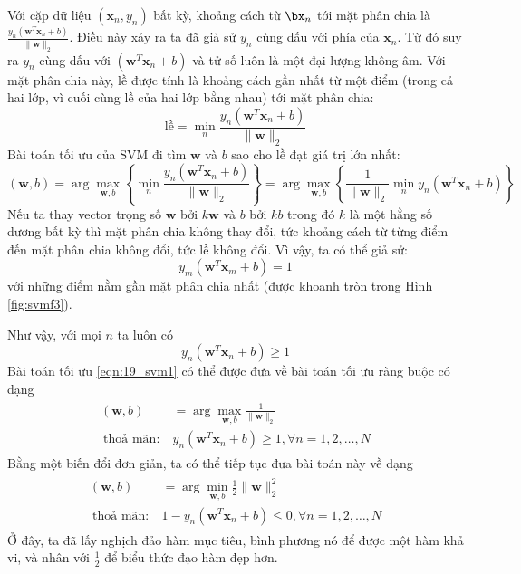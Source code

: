 Với cặp dữ liệu
$(\mathbf{x}_n, y_n)$ bất kỳ, khoảng cách từ $\bx_n$ tới mặt phân chia là
\begin{math}
\frac{y_n(\mathbf{w}^T\mathbf{x}_n + b)}{\|\mathbf{w}\|_2}
\end{math}.
Điều này xảy ra ta đã giả sử $y_n$ cùng dấu với {phía} của $\mathbf{x}_n$. Từ đó suy ra $y_n$ cùng dấu với
$(\mathbf{w}^T\mathbf{x}_n + b)$ và tử số luôn là một đại lượng không âm.
Với mặt phân chia này, lề được tính là khoảng cách gần nhất từ một
điểm (trong cả hai lớp, vì cuối cùng lề của hai lớp bằng nhau)
tới mặt phân chia:
\begin{equation*}
\text{lề} = \min_{n} \frac{y_n(\mathbf{w}^T\mathbf{x}_n + b)}{\|\mathbf{w}\|_2}
\end{equation*}
Bài toán tối ưu của SVM đi tìm $\mathbf{w}$ và $b$ sao cho lề đạt giá trị lớn nhất:
\begin{equation}
\label{eqn:19_svm1}
(\mathbf{w}, b) = \arg\max_{\mathbf{w}, b} \left\{
\min_{n} \frac{y_n(\mathbf{w}^T\mathbf{x}_n + b)}{\|\mathbf{w}\|_2}
\right\}
= \arg\max_{\mathbf{w}, b}\left\{
\frac{1}{\|\mathbf{w}\|_2} \min_{n} y_n(\mathbf{w}^T\mathbf{x}_n + b)
\right\}
\end{equation}
Nếu ta thay vector trọng số $\mathbf{w}$ bởi
$k\mathbf{w}$ và $b$ bởi $kb$ trong đó $k$ là một hằng số dương {bất kỳ}
thì mặt phân chia không thay đổi, tức khoảng cách từ từng điểm đến mặt phân chia
không đổi, tức lề không đổi. Vì vậy, ta có thể giả
sử:
\begin{equation*}
y_m(\mathbf{w}^T\mathbf{x}_m + b) = 1 %
\end{equation*}
{với những điểm nằm gần mặt phân chia nhất} (được khoanh tròn trong Hình \ref{fig:svmf3}).

Như vậy, với mọi $n$ ta luôn có
\begin{equation*}
y_n(\mathbf{w}^T\mathbf{x}_n + b) \geq 1
\end{equation*}
Bài toán tối ưu \eqref{eqn:19_svm1} có thể được đưa về bài toán tối ưu ràng buộc có dạng
\begin{eqnarray}
\begin{aligned}
(\mathbf{w}, b) &= \arg \max_{\mathbf{w}, b} \frac{1}{\|\mathbf{w}\|_2}   \\\
\text{thoả mãn:}~ & y_n(\mathbf{w}^T\mathbf{x}_n + b) \geq 1, \forall n = 1, 2, \dots, N
\end{aligned}
\end{eqnarray}
Bằng một biến đổi đơn giản, ta có thể tiếp tục đưa bài toán này về dạng
\begin{eqnarray}
\label{eqn:19_svm3}
\begin{aligned}
(\mathbf{w}, b) &= \arg \min_{\mathbf{w}, b} \frac{1}{2}\|\mathbf{w}\|_2^2   \\\
\text{thoả mãn:}~ & 1 - y_n(\mathbf{w}^T\mathbf{x}_n + b) \leq 0, \forall n = 1, 2, \dots, N
\end{aligned}
\end{eqnarray}
Ở đây, ta đã lấy nghịch đảo hàm mục tiêu, bình phương nó để được một hàm
khả vi, và nhân với $\displaystyle\frac{1}{2}$ để biểu thức đạo hàm đẹp hơn.

